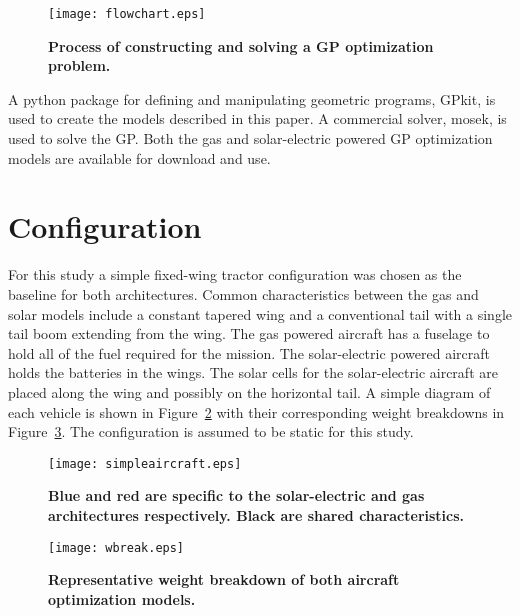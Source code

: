 \begin{figure}[H]
	\begin{center}
	\texttt{[image: flowchart.eps]}
    \caption{\textbf{Process of constructing and solving a GP optimization problem. }}
	\label{f:flowchart}
	\end{center}
\end{figure}

A python package for defining and manipulating geometric programs, GPkit\cite{gpkitdocs}, is used to create the models described in this paper.  
A commercial solver, mosek\cite{mosek}, is used to solve the GP. 
Both the gas and solar-electric powered GP optimization models are available for download and use. \cite{gassolartrade} \\

\section{Configuration}

For this study a simple fixed-wing tractor configuration was chosen as the baseline for both architectures. 
Common characteristics between the gas and solar models include a constant tapered wing and a conventional tail with a single tail boom extending from the wing.  
The gas powered aircraft has a fuselage to hold all of the fuel required for the mission.  
The solar-electric powered aircraft holds the batteries in the wings.  
The solar cells for the solar-electric aircraft are placed along the wing and possibly on the horizontal tail.  
A simple diagram of each vehicle is shown in Figure~\ref{f:simpleaircraft} with their corresponding weight breakdowns in Figure~\ref{f:wbreak}.
The configuration is assumed to be static for this study.

\begin{figure}[H]
	\begin{center}
	\texttt{[image: simpleaircraft.eps]}
    \caption{\textbf{Blue and red are specific to the solar-electric and gas architectures respectively.  Black are shared characteristics.}}
	\label{f:simpleaircraft}
	\end{center}
\end{figure}

\begin{figure}[H]
	\begin{center}
	\texttt{[image: wbreak.eps]}
   \caption{\textbf{Representative weight breakdown of both aircraft optimization models.}}
	\label{f:wbreak}
	\end{center}
\end{figure}

